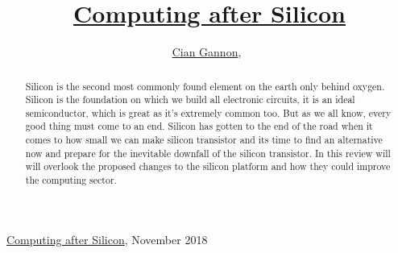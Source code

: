 \documentclass[journal]{IEEEtran}
\begin{document}
%
{\href{https://github.com/cian2009/ResearchMethods}{Computing after Silicon}, November 2018}

\title{\href{https://github.com/cian2009/ResearchMethods}{Computing after Silicon}}
\author{\href{https://github.com/cian2009}{Cian Gannon},~}
\maketitle

\begin{abstract}

Silicon is the second most commonly found element on the earth only behind oxygen. Silicon is the foundation on which we build all electronic circuits, it is an ideal semiconductor, which is great as it's extremely common too. But as we all know, every good thing must come to an end. Silicon has gotten to the end of the road when it comes to how small we can make silicon transistor and its time to find an alternative now and prepare for the inevitable downfall of the silicon transistor. In this review will will overlook the proposed changes to the silicon platform and how they could improve the computing sector.

\end{abstract}
\end{document}
